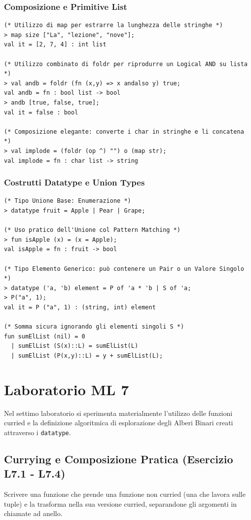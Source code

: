 \documentclass[12pt, a4paper]{article}
\begin{document}
\subsubsection{Composizione e Primitive List}
\begin{verbatim}
(* Utilizzo di map per estrarre la lunghezza delle stringhe *)
> map size ["La", "lezione", "nove"];
val it = [2, 7, 4] : int list

(* Utilizzo combinato di foldr per riprodurre un Logical AND su lista *)
> val andb = foldr (fn (x,y) => x andalso y) true;
val andb = fn : bool list -> bool
> andb [true, false, true];
val it = false : bool

(* Composizione elegante: converte i char in stringhe e li concatena *)
> val implode = (foldr (op ^) "") o (map str);
val implode = fn : char list -> string
\end{verbatim}

\subsubsection{Costrutti Datatype e Union Types}
\begin{verbatim}
(* Tipo Unione Base: Enumerazione *)
> datatype fruit = Apple | Pear | Grape;

(* Uso pratico dell'Unione col Pattern Matching *)
> fun isApple (x) = (x = Apple);
val isApple = fn : fruit -> bool

(* Tipo Elemento Generico: può contenere un Pair o un Valore Singolo *)
> datatype ('a, 'b) element = P of 'a * 'b | S of 'a;
> P("a", 1);
val it = P ("a", 1) : (string, int) element

(* Somma sicura ignorando gli elementi singoli S *)
fun sumElList (nil) = 0
  | sumElList (S(x)::L) = sumElList(L)
  | sumElList (P(x,y)::L) = y + sumElList(L);
\end{verbatim}


\section{Laboratorio ML 7}

Nel settimo laboratorio si sperimenta materialmente l'utilizzo delle funzioni curried e la definizione algoritmica di esplorazione degli Alberi Binari creati attraverso i \texttt{datatype}.

\subsection{Currying e Composizione Pratica (Esercizio L7.1 - L7.4)}
Scrivere una funzione che prende una funzione non curried (una che lavora sulle tuple) e la trasforma nella sua versione curried, separandone gli argomenti in chiamate ad anello.
\end{document}

